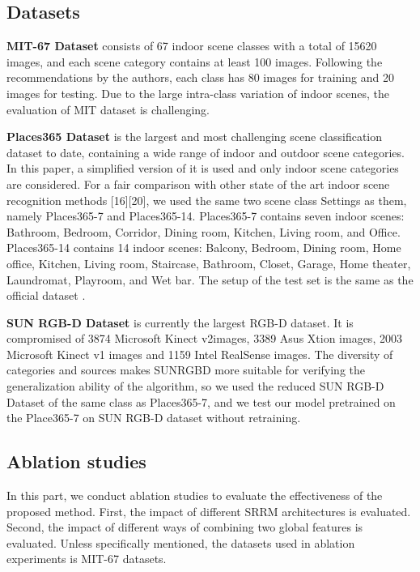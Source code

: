 \documentclass[conference]{IEEEtran}
\begin{document}
\subsection{Datasets}

\textbf{MIT-67 Dataset }\cite{ref8} consists of 67 indoor scene classes with a total of 15620 images, and each scene category contains at least 100 images. Following the recommendations by the authors\cite{ref8}, each class has 80 images for training and 20 images for testing. Due to the large intra-class variation of indoor scenes, the evaluation of MIT dataset is challenging.

\textbf{Places365 Dataset} \cite{ref14} is the largest and most challenging scene classification dataset to date, containing a wide range of indoor and outdoor scene categories. In this paper, a simplified version of it is used and only indoor scene categories are considered. For a fair comparison with other state of the art indoor scene recognition methods [16][20], we used the same two scene class Settings as them, namely Places365-7 and Places365-14. Places365-7 contains seven indoor scenes: Bathroom, Bedroom, Corridor, Dining room, Kitchen, Living room, and Office. Places365-14 contains 14 indoor scenes: Balcony, Bedroom, Dining room, Home office, Kitchen, Living room, Staircase, Bathroom, Closet, Garage, Home theater, Laundromat, Playroom, and Wet bar. The setup of the test set is the same as the official dataset \cite{ref14}.

\textbf{SUN RGB-D Dataset} \cite{ref30} is currently the largest RGB-D dataset. It is compromised of 3874 Microsoft Kinect v2images, 3389 Asus Xtion images, 2003 Microsoft Kinect v1 images and 1159 Intel RealSense images. The diversity of categories and sources makes SUNRGBD more suitable for verifying the generalization ability of the algorithm, so we used the reduced SUN RGB-D Dataset of the same class as Places365-7, and we test our model pretrained on the Place365-7 on SUN RGB-D dataset without retraining.

\subsection{Ablation studies}

In this part, we conduct ablation studies to evaluate the effectiveness of the proposed method. First, the impact of different SRRM architectures is evaluated. Second, the impact of different ways of combining two global features is evaluated. Unless specifically mentioned, the datasets used in ablation experiments is MIT-67 datasets. 
\end{document}
